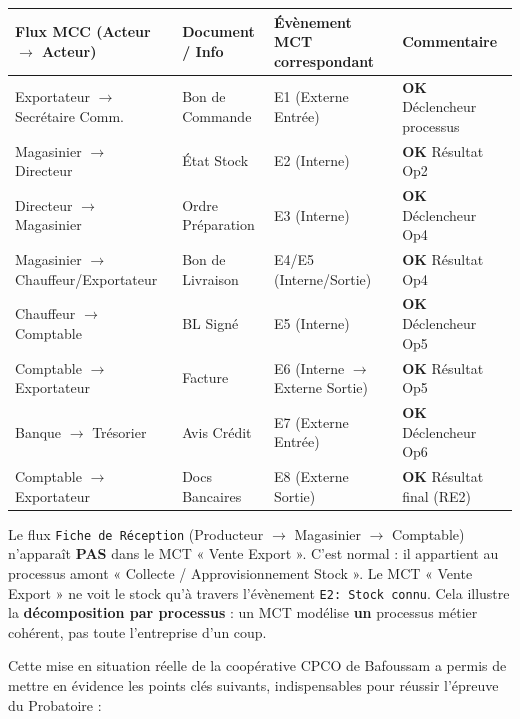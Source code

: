 \documentclass[11pt]{article}
\newcounter{popsec}
\newcounter{popsub}
\newcommand{\courssub}[1]{%
  \stepcounter{popsub}%
  \par\vspace{9pt}\noindent{\popxbold\fontsize{11.5}{13}\selectfont\color{popink}{\color{poporange}\thepopsec.\thepopsub}\hspace{6pt}#1}\par\nopagebreak\vspace{4pt}
}
\begin{document}
\begin{exoresolu}
\begin{center}
\begin{tabular}{|l|l|l|l|}
\hline
\textbf{Flux MCC (Acteur $\to$ Acteur)} & \textbf{Document / Info} & \textbf{Évènement MCT correspondant} & \textbf{Commentaire} \\
\hline
Exportateur $\to$ Secrétaire Comm. & Bon de Commande & E1 (Externe Entrée) & \textbf{OK} Déclencheur processus \\
Magasinier $\to$ Directeur & État Stock & E2 (Interne) & \textbf{OK} Résultat Op2 \\
Directeur $\to$ Magasinier & Ordre Préparation & E3 (Interne) & \textbf{OK} Déclencheur Op4 \\
Magasinier $\to$ Chauffeur/Exportateur & Bon de Livraison & E4/E5 (Interne/Sortie) & \textbf{OK} Résultat Op4 \\
Chauffeur $\to$ Comptable & BL Signé & E5 (Interne) & \textbf{OK} Déclencheur Op5 \\
Comptable $\to$ Exportateur & Facture & E6 (Interne $\to$ Externe Sortie) & \textbf{OK} Résultat Op5 \\
Banque $\to$ Trésorier & Avis Crédit & E7 (Externe Entrée) & \textbf{OK} Déclencheur Op6 \\
Comptable $\to$ Exportateur & Docs Bancaires & E8 (Externe Sortie) & \textbf{OK} Résultat final (RE2) \\
\hline
\end{tabular}
\end{center}

\begin{aretenir}
Le flux \texttt{Fiche de Réception} (Producteur $\to$ Magasinier $\to$ Comptable) n'apparaît \textbf{PAS} dans le MCT « Vente Export ». C'est normal : il appartient au processus amont « Collecte / Approvisionnement Stock ». Le MCT « Vente Export » ne voit le stock qu'à travers l'évènement \texttt{E2: Stock connu}. Cela illustre la \textbf{décomposition par processus} : un MCT modélise \textbf{un} processus métier cohérent, pas toute l'entreprise d'un coup.
\end{aretenir}
\end{exoresolu}

\courssub{Bilan de l'activité}
Cette mise en situation réelle de la coopérative CPCO de Bafoussam a permis de mettre en évidence les points clés suivants, indispensables pour réussir l'épreuve du Probatoire :
\end{document}
